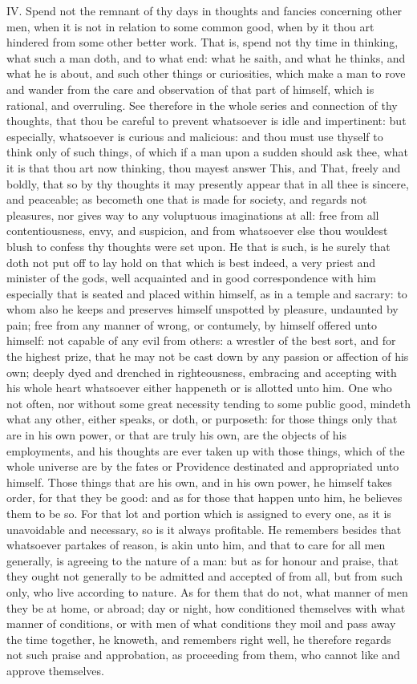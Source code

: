 IV. Spend not the remnant of thy days in thoughts and fancies concerning
other men, when it is not in relation to some common good, when by it thou
art hindered from some other better work. That is, spend not thy time in
thinking, what such a man doth, and to what end: what he saith, and what
he thinks, and what he is about, and such other things or curiosities,
which make a man to rove and wander from the care and observation of that
part of himself, which is rational, and overruling. See therefore in the
whole series and connection of thy thoughts, that thou be careful to
prevent whatsoever is idle and impertinent: but especially, whatsoever is
curious and malicious: and thou must use thyself to think only of such
things, of which if a man upon a sudden should ask thee, what it is that
thou art now thinking, thou mayest answer This, and That, freely and
boldly, that so by thy thoughts it may presently appear that in all thee
is sincere, and peaceable; as becometh one that is made for society, and
regards not pleasures, nor gives way to any voluptuous imaginations at
all: free from all contentiousness, envy, and suspicion, and from
whatsoever else thou wouldest blush to confess thy thoughts were set upon.
He that is such, is he surely that doth not put off to lay hold on that
which is best indeed, a very priest and minister of the gods, well
acquainted and in good correspondence with him especially that is seated
and placed within himself, as in a temple and sacrary: to whom also he
keeps and preserves himself unspotted by pleasure, undaunted by pain; free
from any manner of wrong, or contumely, by himself offered unto himself:
not capable of any evil from others: a wrestler of the best sort, and for
the highest prize, that he may not be cast down by any passion or
affection of his own; deeply dyed and drenched in righteousness, embracing
and accepting with his whole heart whatsoever either happeneth or is
allotted unto him. One who not often, nor without some great necessity
tending to some public good, mindeth what any other, either speaks, or
doth, or purposeth: for those things only that are in his own power, or
that are truly his own, are the objects of his employments, and his
thoughts are ever taken up with those things, which of the whole universe
are by the fates or Providence destinated and appropriated unto himself.
Those things that are his own, and in his own power, he himself takes
order, for that they be good: and as for those that happen unto him, he
believes them to be so. For that lot and portion which is assigned to
every one, as it is unavoidable and necessary, so is it always profitable.
He remembers besides that whatsoever partakes of reason, is akin unto him,
and that to care for all men generally, is agreeing to the nature of a
man: but as for honour and praise, that they ought not generally to be
admitted and accepted of from all, but from such only, who live according
to nature. As for them that do not, what manner of men they be at home, or
abroad; day or night, how conditioned themselves with what manner of
conditions, or with men of what conditions they moil and pass away the
time together, he knoweth, and remembers right well, he therefore regards
not such praise and approbation, as proceeding from them, who cannot like
and approve themselves.

